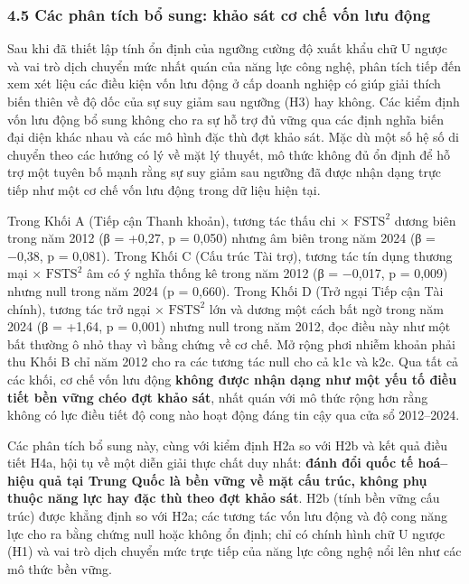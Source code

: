 \documentclass[12pt,a4paper]{article}
\begin{document}
\hypertarget{45-cuxe1c-phuxe2n-tuxedch-bux1ed5-sung-khux1ea3o-suxe1t-cux1a1-chux1ebf-vux1ed1n-lux1b0u-ux111ux1ed9ng}{%
\subsubsection{4.5 Các phân tích bổ sung: khảo sát cơ chế vốn lưu
động}\label{45-cuxe1c-phuxe2n-tuxedch-bux1ed5-sung-khux1ea3o-suxe1t-cux1a1-chux1ebf-vux1ed1n-lux1b0u-ux111ux1ed9ng}}

Sau khi đã thiết lập tính ổn định của ngưỡng cường độ xuất khẩu chữ U
ngược và vai trò dịch chuyển mức nhất quán của năng lực công nghệ, phân
tích tiếp đến xem xét liệu các điều kiện vốn lưu động ở cấp doanh nghiệp
có giúp giải thích biến thiên về độ dốc của sự suy giảm sau ngưỡng (H3)
hay không. Các kiểm định vốn lưu động bổ sung không cho ra sự hỗ trợ đủ
vững qua các định nghĩa biến đại diện khác nhau và các mô hình đặc thù
đợt khảo sát. Mặc dù một số hệ số di chuyển theo các hướng có lý về mặt
lý thuyết, mô thức không đủ ổn định để hỗ trợ một tuyên bố mạnh rằng sự
suy giảm sau ngưỡng đã được nhận dạng trực tiếp như một cơ chế vốn lưu
động trong dữ liệu hiện tại.

Trong Khối A (Tiếp cận Thanh khoản), tương tác thấu chi ×
\(\mathrm{FSTS}^2\) dương biên trong năm 2012 (β = +0,27, p = 0,050)
nhưng âm biên trong năm 2024 (β = −0,38, p = 0,081). Trong Khối C (Cấu
trúc Tài trợ), tương tác tín dụng thương mại × \(\mathrm{FSTS}^2\) âm có
ý nghĩa thống kê trong năm 2012 (β = −0,017, p = 0,009) nhưng null trong
năm 2024 (p = 0,660). Trong Khối D (Trở ngại Tiếp cận Tài chính), tương
tác trở ngại × \(\mathrm{FSTS}^2\) lớn và dương một cách bất ngờ trong
năm 2024 (β = +1,64, p = 0,001) nhưng null trong năm 2012, đọc điều này
như một bất thường ô nhỏ thay vì bằng chứng về cơ chế. Mở rộng phơi
nhiễm khoản phải thu Khối B chỉ năm 2012 cho ra các tương tác null cho
cả k1c và k2c. Qua tất cả các khối, cơ chế vốn lưu động \textbf{không
được nhận dạng như một yếu tố điều tiết bền vững chéo đợt khảo sát},
nhất quán với mô thức rộng hơn rằng không có lực điều tiết độ cong nào
hoạt động đáng tin cậy qua cửa sổ 2012--2024.

Các phân tích bổ sung này, cùng với kiểm định H2a so với H2b và kết quả
điều tiết H4a, hội tụ về một diễn giải thực chất duy nhất: \textbf{đánh
đổi quốc tế hoá--hiệu quả tại Trung Quốc là bền vững về mặt cấu trúc,
không phụ thuộc năng lực hay đặc thù theo đợt khảo sát}. H2b (tính bền
vững cấu trúc) được khẳng định so với H2a; các tương tác vốn lưu động và
độ cong năng lực cho ra bằng chứng null hoặc không ổn định; chỉ có chính
hình chữ U ngược (H1) và vai trò dịch chuyển mức trực tiếp của năng lực
công nghệ nổi lên như các mô thức bền vững.
\end{document}

